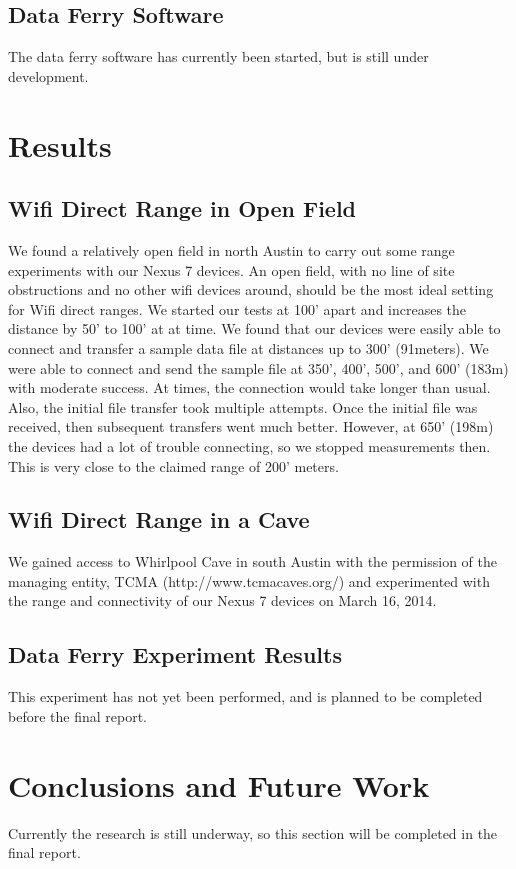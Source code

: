 \documentclass[10pt,twocolumn]{article}
\begin{document}
\subsection{Data Ferry Software}
The data ferry software has currently been started, but is still under development.

\section{Results}

\subsection{Wifi Direct Range in Open Field}

We found a relatively open field in north Austin to carry out some range experiments with our Nexus 7 devices.
An open field, with no line of site obstructions and no other wifi devices around, should be the most ideal setting for Wifi direct ranges.
We started our tests at 100' apart and increases the distance by 50' to 100' at at time.
We found that our devices were easily able to connect and transfer a sample data file at distances up to 300' (91meters). 
We were able to connect and send the sample file at 350', 400', 500', and 600' (183m) with moderate success. 
At times, the connection would take longer than usual.
Also, the initial file transfer took multiple attempts.
Once the initial file was received, then subsequent transfers went much better.
However, at 650' (198m) the devices had a lot of trouble connecting, so we stopped measurements then.
This is very close to the claimed range of 200' meters.

\subsection{Wifi Direct Range in a Cave}
We gained access to Whirlpool Cave in south Austin with the permission of the managing entity, TCMA (http://www.tcmacaves.org/) and experimented with the range and connectivity of our Nexus 7 devices on March 16, 2014.

\subsection{Data Ferry Experiment Results}
This experiment has not yet been performed, and is planned to be completed before the final report.

\section{Conclusions and Future Work}
Currently the research is still underway, so this section will be completed in the final report.
\end{document}
